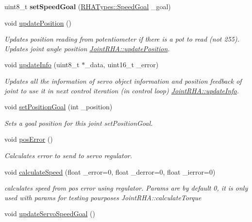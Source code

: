 \begin{DoxyCompactItemize}
\item 
uint8\+\_\+t {\bfseries set\+Speed\+Goal} (\hyperlink{structRHATypes_1_1SpeedGoal}{R\+H\+A\+Types\+::\+Speed\+Goal} \+\_\+goal)\hypertarget{classJointRHA_a5caf9ac1dd4f9d97917168975af4d3fc}{}\label{classJointRHA_a5caf9ac1dd4f9d97917168975af4d3fc}

\item 
void \hyperlink{classJointRHA_a35e934c28ecaf6870c40ceda272f2391}{update\+Position} ()
\begin{DoxyCompactList}\small\item\em Updates position reading from potentiometer if there is a pot to read (not 255). Updates joint angle position  \hyperlink{classJointRHA_a35e934c28ecaf6870c40ceda272f2391}{Joint\+R\+H\+A\+::update\+Position}. \end{DoxyCompactList}\item 
void \hyperlink{classJointRHA_a47b3cdcdd16e52f60dbcfe3aa52ef540}{update\+Info} (uint8\+\_\+t $\ast$\+\_\+data, uint16\+\_\+t \+\_\+error)
\begin{DoxyCompactList}\small\item\em Updates all the information of servo object information and position feedback of joint to use it in next control iteration (in control loop)  \hyperlink{classJointRHA_a47b3cdcdd16e52f60dbcfe3aa52ef540}{Joint\+R\+H\+A\+::update\+Info}. \end{DoxyCompactList}\item 
void \hyperlink{classJointRHA_a4de486ebe656609fdc0fe7281a69c6eb}{set\+Position\+Goal} (int \+\_\+position)
\begin{DoxyCompactList}\small\item\em Sets a goal position for this joint  set\+Position\+Goal. \end{DoxyCompactList}\item 
void \hyperlink{classJointRHA_a46047d4c042cb9963c9cec7809d02c64}{pos\+Error} ()\hypertarget{classJointRHA_a46047d4c042cb9963c9cec7809d02c64}{}\label{classJointRHA_a46047d4c042cb9963c9cec7809d02c64}

\begin{DoxyCompactList}\small\item\em Calculates error to send to servo regulator. \end{DoxyCompactList}\item 
void \hyperlink{classJointRHA_a8b828c0ac7b125f0ba87d5d76c1c6644}{calculate\+Speed} (float \+\_\+error=0, float \+\_\+derror=0, float \+\_\+ierror=0)
\begin{DoxyCompactList}\small\item\em calculates speed from pos error using regulator. Params are by default 0, it is only used with params for testing pourposes  Joint\+R\+H\+A\+::calculate\+Torque \end{DoxyCompactList}\item 
void \hyperlink{classJointRHA_a83d6397ce8495fcb6aa6c9c787029cb8}{update\+Servo\+Speed\+Goal} ()\hypertarget{classJointRHA_a83d6397ce8495fcb6aa6c9c787029cb8}{}\label{classJointRHA_a83d6397ce8495fcb6aa6c9c787029cb8}


\end{DoxyCompactItemize}
